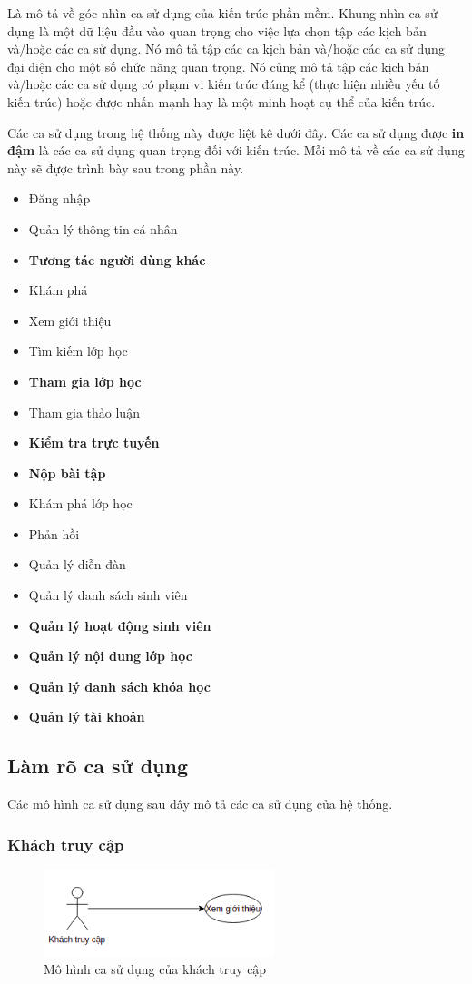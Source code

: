 \documentclass[./../main_file.tex]{subfiles}
\begin{document}
	Là mô tả về góc nhìn ca sử dụng của kiến trúc phần mềm. Khung nhìn ca sử dụng là một dữ liệu đầu
	vào quan trọng cho việc lựa chọn tập các kịch bản và/hoặc các ca sử dụng. Nó mô tả tập các ca kịch 
	bản và/hoặc các ca sử dụng đại diện cho một số chức năng quan trọng. Nó cũng mô tả tập các kịch
	bản và/hoặc các ca sử dụng có phạm vi kiến trúc đáng kể (thực hiện nhiều yếu tố kiến trúc)
	hoặc được nhấn mạnh hay là một minh hoạt cụ thể của kiến trúc.
	
	
	Các ca sử dụng trong hệ thống này được liệt kê dưới đây. Các ca sử dụng được \textbf{in đậm} là 
	các ca sử dụng quan trọng đối với kiến trúc. Mỗi mô tả về các ca sử dụng này sẽ đựợc trình bày 
	sau trong phần này.
	\begin{itemize}
		\item Đăng nhập
		\item Quản lý thông tin cá nhân
		\item \textbf{Tương tác người dùng khác}
		\item Khám phá
		\item Xem giới thiệu
		\item Tìm kiếm lớp học
		\item \textbf{Tham gia lớp học}
		\item Tham gia thảo luận
		\item \textbf{Kiểm tra trực tuyến}
		\item \textbf{Nộp bài tập}
		\item Khám phá lớp học
		\item Phản hồi
		\item Quản lý diễn đàn
		\item Quản lý danh sách sinh viên
		\item \textbf{Quản lý hoạt động sinh viên}
		\item \textbf{Quản lý nội dung lớp học}
		\item \textbf{Quản lý danh sách khóa học}
		\item \textbf{Quản lý tài khoản}
	\end{itemize}

	\subsection{Làm rõ ca sử dụng}
	Các mô hình ca sử dụng sau đây mô tả các ca sử dụng của hệ thống.
	\subsubsection{Khách truy cập}
	\begin{figure}[H]
		\centering
		\includegraphics[width=0.6\textwidth]{./images/usecasevisitor.png}
		\caption{Mô hình ca sử dụng của khách truy cập}
	\end{figure}
\end{document}
